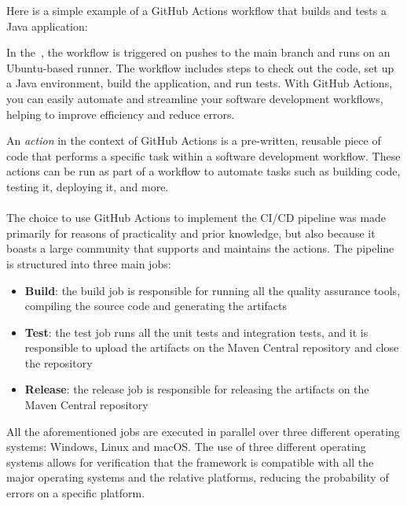 Here is a simple example of a GitHub Actions workflow that builds and tests a Java application:



In the~, the workflow is triggered on pushes to the main branch and runs on an Ubuntu-based runner. The workflow
includes steps to check out the code, set up a Java environment, build the application, and run tests. With GitHub Actions, you can easily
automate and streamline your software development workflows, helping to improve efficiency and reduce errors.

An \emph{action} in the context of GitHub Actions is a pre-written, reusable piece of code that performs a specific task within a software development
workflow. These actions can be run as part of a workflow to automate tasks such as building code, testing it, deploying it, and more.

\paragraph*{}

The choice to use GitHub Actions to implement the CI/CD pipeline was made primarily for reasons of practicality and prior knowledge, but also because
it boasts a large community that supports and maintains the actions.
The pipeline is structured into three main jobs:

\begin{itemize}
	\item \textbf{Build}: the build job is responsible for running all the quality assurance tools, compiling the source code and generating the
	      artifacts
	\item \textbf{Test}: the test job runs all the unit tests and integration tests, and it is responsible to upload the artifacts on the
	      Maven Central repository and close the repository
	\item \textbf{Release}: the release job is responsible for releasing the artifacts on the Maven Central repository
\end{itemize}

All the aforementioned jobs are executed in parallel over three different operating systems: Windows, Linux and macOS.
The use of three different operating systems allows for verification that the framework is compatible with all the major operating systems and the relative
platforms, reducing the probability of errors on a specific platform.

